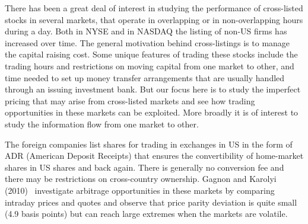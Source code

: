 There has been a great deal of interest in studying the performance of cross-listed stocks in several markets, that operate in overlapping or in non-overlapping hours during a day. Both in NYSE and in NASDAQ the listing of non-US firms has increased over time. The general motivation behind cross-listings is to manage the capital raising cost. Some unique features of trading these stocks include the trading hours and restrictions on moving capital from one market to other, and time needed to set up money transfer arrangements that are usually handled through an issuing investment bank. But our focus here is to study the imperfect pricing that may arise from cross-listed markets and see how trading opportunities in these markets can be exploited. More broadly it is of interest to study the information flow from one market to other.


The foreign companies list shares for trading in exchanges in US in the form of ADR (American Deposit Receipts) that ensures the convertibility of home-market shares in US shares and back again. There is generally no conversion fee and there may be restrictions on cross-country ownership. Gagnon and Karolyi (2010)~\cite{gagkar} investigate arbitrage opportunities in these markets by comparing intraday prices and quotes and observe that price parity deviation is quite small (4.9 basis points) but can reach large extremes when the markets are volatile. 


